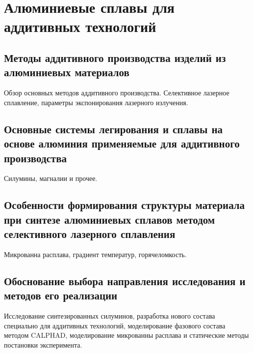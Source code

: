 \chapter{Алюминиевые сплавы для аддитивных технологий}\label{ch:chapter1}

\section{Методы аддитивного производства изделий из алюминиевых материалов}\label{sec:chapter1/section1}

Обзор основных методов аддитивного производства. Селективное лазерное сплавление, параметры экспонирования лазерного излучения.

\section{Основные системы легирования и сплавы на основе алюминия применяемые для аддитивного производства}\label{sec:chapter1/section2}

Силумины, магналии и прочее.

\section{Особенности формирования структуры материала при синтезе алюминиевых сплавов методом селективного лазерного сплавления}\label{sec:chapter1/section3}

Микрованна расплава, градиент температур, горячеломкость.

\section{Обоснование выбора направления исследования и методов его реализации}\label{sec:chapter1/section4}

Исследование синтезированных силуминов, разработка нового состава специально для аддитивных технологий, моделирование фазового состава методом CALPHAD, моделирование микрованны расплава и статические методы постановки эксперимента.